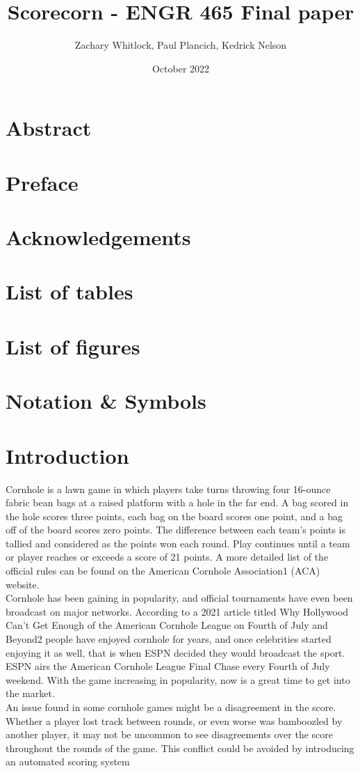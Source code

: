 \documentclass{article}
\title{Scorecorn - ENGR 465 Final paper}
\author{Zachary Whitlock, Paul Plancich, Kedrick Nelson}
\date{October 2022}
\begin{document}
\captionsetup[figure]{font=footnotesize,labelfont=Small}

\maketitle
\newpage

\section{Abstract}
\section{Preface}
\section{Acknowledgements}

\tableofcontents

\section{List of tables}
\section{List of figures}
\section{Notation \& Symbols}

\section{Introduction}
Cornhole is a lawn game in which players take turns throwing four 16-ounce fabric bean bags at a raised platform with a hole in the far end. A bag scored in the hole scores three points, each bag on the board scores one point, and a bag off of the board scores zero points. The difference between each team’s points is tallied and considered as the points won each round. Play continues until a team or player reaches or exceeds a score of 21 points. A more detailed list of the official rules can be found on the American Cornhole Association1 (ACA) website. \\
Cornhole has been gaining in popularity, and official tournaments have even been broadcast on major networks. According to a 2021 article titled Why Hollywood Can’t Get Enough of the American Cornhole League on Fourth of July and Beyond2 people have enjoyed cornhole for years, and once celebrities started enjoying it as well, that is when ESPN decided they would broadcast the sport. ESPN airs the American Cornhole League Final Chase every Fourth of July weekend. With the game increasing in popularity, now is a great time to get into the market. \\
An issue found in some cornhole games might be a disagreement in the score. Whether a player lost track between rounds, or even worse was bamboozled by another player, it may not be uncommon to see disagreements over the score throughout the rounds of the game. This conflict could be avoided by introducing an automated scoring system
\end{document}
